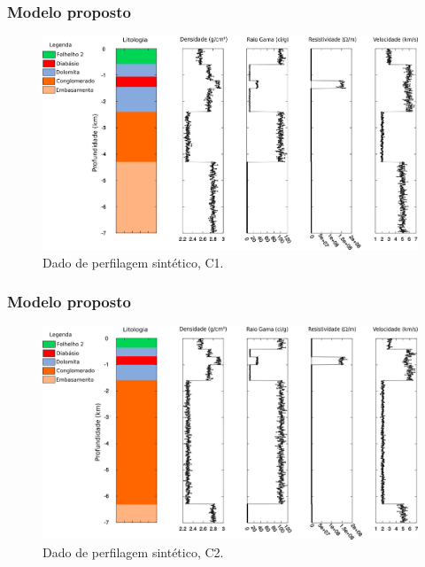 \documentclass[10pt]{beamer} %
\begin{document}
\begin{frame}
	\frametitle{Modelo proposto}
	\begin{figure}[H]
		\centering
			\includegraphics[scale=0.37]{Imagens/PocoC1.png}
		\caption{Dado de perfilagem sintético, C1.}
		\label{C1}
	\end{figure}
\end{frame}

\begin{frame}
	\frametitle{Modelo proposto}
	\begin{figure}[H]
		\centering
			\includegraphics[scale=0.37]{Imagens/PocoC2.png}
		\caption{Dado de perfilagem sintético, C2.}
		\label{C2}
	\end{figure}
\end{frame}
\end{document}
